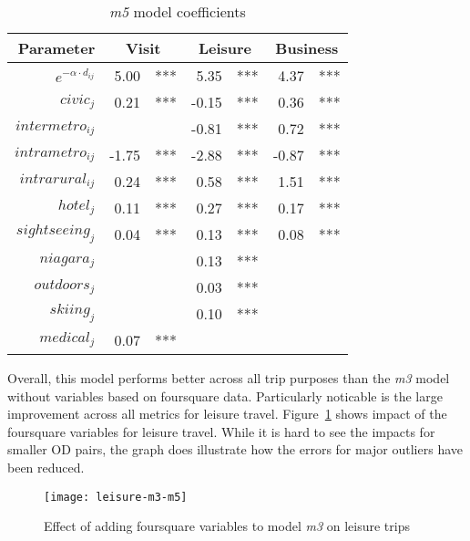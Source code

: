 \begin{table}[H]
\centering
\caption{\textit{m5} model coefficients}
\label{table:m5-coeff}
\begin{tabular}{@{}rrlrlrl@{}}
  \toprule
 Parameter & \multicolumn{2}{c}{Visit} & \multicolumn{2}{c}{Leisure} & \multicolumn{2}{c}{Business} \\ \midrule
  $e^{-\alpha \cdot d_{ij}}$ & 5.00 & *** & 5.35 & *** & 4.37 & *** \\ 
  $civic_j$ & 0.21 & *** & -0.15 & *** & 0.36 & *** \\ 
  $intermetro_{ij}$ &  &  & -0.81 & *** & 0.72 & *** \\ 
  $intrametro_{ij}$  & -1.75 & *** & -2.88 & *** & -0.87 & *** \\   
  $intrarural_{ij}$  & 0.24 & *** & 0.58 & *** & 1.51 & *** \\ 
  $hotel_j$ & 0.11 & *** & 0.27 & *** & 0.17 & *** \\ 
  $sightseeing_j$  & 0.04 & *** & 0.13 & *** & 0.08 & *** \\ 
  $niagara_j$&  &  & 0.13 & *** &  &  \\ 
  $outdoors_j$ &  &  & 0.03 & *** &  &  \\ 
  $skiing_j$ &  &  & 0.10 & *** &  &  \\ 
  $medical_j$  & 0.07 & *** &  &  &  &  \\ 
   \bottomrule
\end{tabular}
\end{table}

Overall, this model performs better across all trip purposes than the \textit{m3} model without variables based on foursquare data. Particularly noticable is the large improvement across all metrics for leisure travel. Figure~\ref{fig:leisure-m3-m5} shows impact of the foursquare variables for leisure travel. While it is hard to see the impacts for smaller OD pairs, the graph does illustrate how the errors for major outliers have been reduced. 

\begin{figure}[H]
\centering
\texttt{[image: leisure-m3-m5]}
\caption{Effect of adding foursquare variables to model \textit{m3} on leisure trips}
\label{fig:leisure-m3-m5}
\end{figure}



